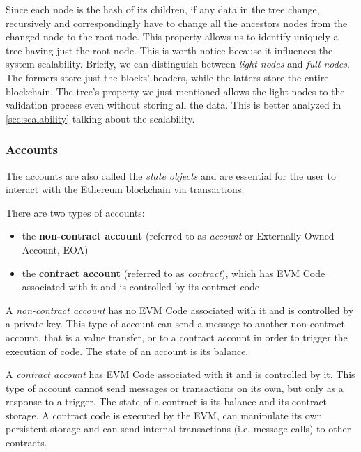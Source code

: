 Since each node is the hash of its children, if any data in the tree change,
recursively and correspondingly have to change all the ancestors nodes from the
changed node to the root node. This property allows us to identify uniquely a
tree having just the root node. This is worth notice because it influences
the system scalability. Briefly, we can distinguish between \emph{light nodes}
and \emph{full nodes}. The formers store just the blocks' headers, while the
latters store the entire blockchain. The tree's property we just mentioned
allows the light nodes to the validation process even without storing all the
data. This is better analyzed in \autoref{sec:scalability} talking about the
scalability.

\subsubsection{Accounts}
\label{sec:accounts}

The accounts are also called the \emph{state objects} and are essential for the
user to interact with the Ethereum blockchain via transactions.

There are two types of accounts:

\begin{itemize}
  \item the \textbf{non-contract account} (referred to as \emph{account} or
  Externally Owned Account, EOA)
  \item the \textbf{contract account} (referred to as \emph{contract}), which
  has EVM Code associated with it and is controlled by its contract code
\end{itemize}

A \emph{non-contract account} has no EVM Code associated with it and is
controlled by a private key. This type of account can send a message to another
non-contract account, that is a value transfer, or to a contract account in
order to trigger the execution of code. The state of an account is its balance.

A \emph{contract account} has EVM Code associated with it and is controlled by
it. This type of account cannot send messages or transactions on its own, but
only as a response to a trigger. The state of a contract is its balance and its
contract storage. A contract code is executed by the EVM, can manipulate its own
persistent storage and can send internal transactions (i.e. message calls) to
other contracts.
